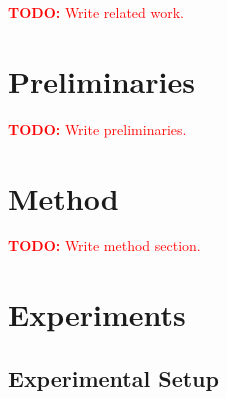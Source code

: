 \documentclass{article}
\theoremstyle{definition}
\theoremstyle{remark}
\newcommand{\todo}[1]{\textcolor{red}{\textbf{TODO:} #1}}
\begin{document}
\todo{Write related work.}

\section{Preliminaries}
\label{sec:preliminaries}


\todo{Write preliminaries.}

\section{Method}
\label{sec:method}

%
%
%

\todo{Write method section.}

\section{Experiments}
\label{sec:experiments}


\subsection{Experimental Setup}
\label{sec:experimental_setup}
\end{document}
